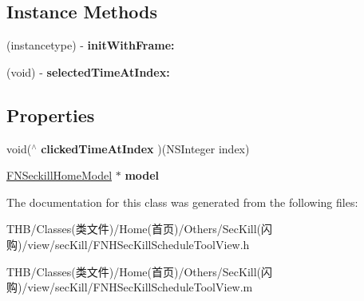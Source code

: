 \subsection*{Instance Methods}
\begin{DoxyCompactItemize}
\item 
\mbox{\label{interface_f_n_h_sec_kill_schedule_tool_view_a6b665ce2c707dfc4efe643dd5b87a1be}} 
(instancetype) -\/ {\bfseries init\+With\+Frame\+:}
\item 
\mbox{\label{interface_f_n_h_sec_kill_schedule_tool_view_a87bf2f42b20b0b5baecff8b1c103e87c}} 
(void) -\/ {\bfseries selected\+Time\+At\+Index\+:}
\end{DoxyCompactItemize}
\subsection*{Properties}
\begin{DoxyCompactItemize}
\item 
\mbox{\label{interface_f_n_h_sec_kill_schedule_tool_view_abfe82e61f49d85e492d387a3e5485161}} 
void($^\wedge$ {\bfseries clicked\+Time\+At\+Index} )(N\+S\+Integer index)
\item 
\mbox{\label{interface_f_n_h_sec_kill_schedule_tool_view_af84703dd3be8d65428bb2b99ca58db94}} 
\mbox{\hyperlink{interface_f_n_seckill_home_model}{F\+N\+Seckill\+Home\+Model}} $\ast$ {\bfseries model}
\end{DoxyCompactItemize}


The documentation for this class was generated from the following files\+:\begin{DoxyCompactItemize}
\item 
T\+H\+B/\+Classes(类文件)/\+Home(首页)/\+Others/\+Sec\+Kill(闪购)/view/sec\+Kill/F\+N\+H\+Sec\+Kill\+Schedule\+Tool\+View.\+h\item 
T\+H\+B/\+Classes(类文件)/\+Home(首页)/\+Others/\+Sec\+Kill(闪购)/view/sec\+Kill/F\+N\+H\+Sec\+Kill\+Schedule\+Tool\+View.\+m\end{DoxyCompactItemize}
